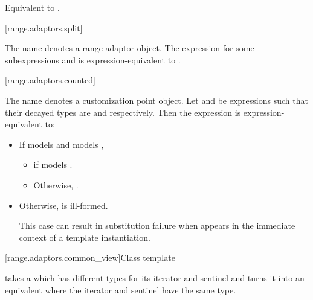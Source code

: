 \begin{addedblock}
\begin{itemdescr}
\pnum
\effects Equivalent to
.
\end{itemdescr}

[range.adaptors.split]{}

\pnum
The name  denotes a
range adaptor object. The expression
 for some subexpressions  and  is
expression-equivalent to .


[range.adaptors.counted]{}

\pnum
The name  denotes a
customization point object.
Let  and  be expressions such that their decayed types are
 and  respectively. Then the expression
 is expression-equivalent to:

\begin{itemize}
\item If  models  and
 models ,
  \begin{itemize}
  \item {} if  models
    .
  \item Otherwise,
    .
\end{itemize}

\item Otherwise,  is ill-formed.
  {\color{newclr}
  \begin{note}
  This case can result in substitution failure when 
  appears in the immediate context of a template instantiation.
  \end{note}
  } %
\end{itemize}


[range.adaptors.common_view]{Class template }

\pnum
{} takes a  which has different types for
its iterator and sentinel and turns it into an equivalent 
where the iterator and sentinel have the same type.


\end{addedblock}
